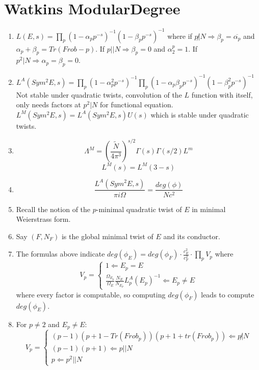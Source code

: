 \documentclass{article}
\newcommand{\Ra}{\Rightarrow}
\newcommand{\La}{\Leftarrow}
\begin{document}
\section{Watkins ModularDegree}
\begin{multicols}{2}
\begin{enumerate}
\item $L(E,s) = \prod_p(1-\alpha_p p^{-s})^{-1}(1-\beta_pp^{-s})^{-1}$ where if $p\not|N \Ra \beta_p = \overline{\alpha_p}$ and $\alpha_p + \beta_p = Tr(Frob-p)$. If $p||N \Ra \beta_p = 0$ and $\alpha_2^p = 1$. If $p^2|N \Ra \alpha_p = \beta_p = 0$.


\item $L^A(Sym^2E,s) = \prod_p (1-\alpha_p^2 p^{-s})^{-1}\prod_p (1-\alpha_p\beta_p p^{-s})^{-1}(1-\beta_p^2 p^{-s})^{-1}$
Not stable under quadratic twists, convolution of the $L$ function with itself, only needs factors at $p^2|N$ for functional equation. $L^M(Sym^2E,s) = L^A(Sym^2E,s)U(s)$ which is stable under quadratic twists.

\item  
\[\Lambda^M = \left(\frac{\tilde{N}}{4\pi^3}\right)^{s/2}\Gamma(s)\Gamma(s/2) L^m\]
\[L^M(s) = L^M(3-s)\]

\item 
\[\frac{L^A(Sym^2E,s)}{\pi i \Omega} = \frac{deg(\phi)}{Nc^2}\]

\item Recall the notion of the $p$-minimal quadratic twist of $E$ in minimal Weierstrass form. 

\item Say $(F,N_F)$ is the global minimal twist of $E$ and its conductor. 

\item The formulas above indicate $deg(\phi_E) = deg(\phi_F) \cdot \frac{c_E^2}{c_F^2} \cdot \prod_p V_p$
where
\[V_p = \left\{\begin{array}{c} 1 \La E_p = E \\ \frac{\Omega_{E_p}}{\Omega_E} \frac{N_E}{N_{E_p}} L^A_p(E_p)^{-1} \La E_p \neq E \end{array}\]
where every factor is computable, so computing $deg(\phi_F)$ leads to compute $deg(\phi_E)$.

\item For $p \neq 2$ and $E_p \neq E$:
\[V_p = \left\{\begin{array}{c} (p-1)(p+1-Tr(Frob_p))(p+1+tr(Frob_p)) \La p \not|N \\  (p-1)(p+1) \La p||N \\ p \La p^2||N\end{array}\right.\]


\end{enumerate}
\end{multicols}
\end{document}

